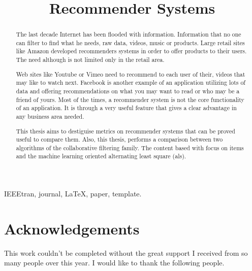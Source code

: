 \documentclass[10pt,journal]{IEEEtran}
\begin{document}
	
	\title{Recommender Systems} %
	\author{
		}
	\maketitle
	\begin{abstract}
		The last decade Internet has been flooded with information. Information that no one can filter to find what he needs, raw data, videos, music or products. Large retail sites like Amazon developed recommenders systems in order to offer products to their users. The need although is not limited only in the retail area. 
		
		Web sites like Youtube or Vimeo need to recommend to each user of their, videos that may like to watch next. Facebook is another example of an application utilizing lots of data and offering recommendations on what you may want to read or who may be a friend of yours. Most of the times, a recommender system is not the core functionality of an application. It is through a very useful feature that gives a clear advantage in any business area needed.
		
		This thesis aims to destiguise metrics on recommender systems  that can be proved useful to compare them. Also, this thesis, performs a comparison between two algorithms of the collaborative filtering family. The content based with focus on items and the machine learning oriented alternating least square (als).
	\end{abstract}
	\begin{IEEEkeywords}
		IEEEtran, journal, \LaTeX, paper, template. %
	\end{IEEEkeywords}

	
	
	
	
	
	


\section*{Acknowledgements}
This work couldn't be completed without the great support I received from so many people over this year. I would like to thank the following people.
\end{document}
